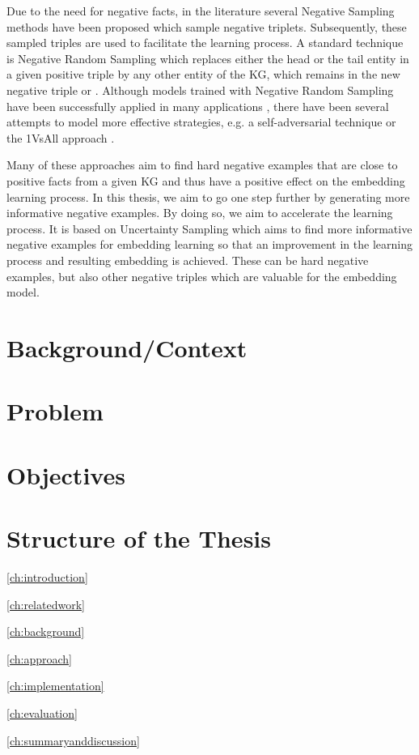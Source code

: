 Due to the need for negative facts, in the literature several Negative Sampling methods have been proposed which sample negative triplets.
Subsequently, these sampled triples are used to facilitate the learning process. 
A standard technique is Negative Random Sampling which replaces either the head or the tail entity in a given positive triple   by any other entity of the \ac{KG}, which remains in the new negative triple  or . 
Although models trained with Negative Random Sampling have been successfully applied in many applications \cite{TransE}, there have been several attempts to model more effective strategies, e.g. 
a self-adversarial technique \cite{RotatE} or the 1VsAll approach \cite{ConvE}.

Many of these approaches aim to find hard negative examples that are close to positive facts from a given \ac{KG} and thus have a positive effect on the embedding learning process. 
In this thesis, we aim to go one step further by generating more informative negative examples. 
By doing so, we aim to accelerate the learning process.
It is based on Uncertainty Sampling which aims to
find more informative negative examples for embedding learning so that an improvement in the learning process and resulting embedding is achieved.
These can be hard negative examples, but also other negative triples which are valuable for the embedding model.


\section{Background/Context}

\section{Problem}

\section{Objectives}

\section{Structure of the Thesis}

\ref{ch:introduction}

\ref{ch:relatedwork}

\ref{ch:background}

\ref{ch:approach}

\ref{ch:implementation}

\ref{ch:evaluation}

\ref{ch:summaryanddiscussion}



